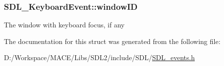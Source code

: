 \subsubsection[{\texorpdfstring{window\+ID}{windowID}}]{ S\+D\+L\+\_\+\+Keyboard\+Event\+::window\+ID}\hypertarget{struct_s_d_l___keyboard_event_a56efb6780b96acd5b50d8f797efb3546}{}\label{struct_s_d_l___keyboard_event_a56efb6780b96acd5b50d8f797efb3546}
The window with keyboard focus, if any 

The documentation for this struct was generated from the following file\+:\begin{DoxyCompactItemize}
\item 
D\+:/\+Workspace/\+M\+A\+C\+E/\+Libs/\+S\+D\+L2/include/\+S\+D\+L/\hyperlink{_s_d_l__events_8h}{S\+D\+L\+\_\+events.\+h}\end{DoxyCompactItemize}
